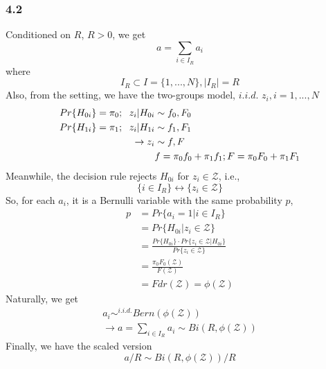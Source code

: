 \documentclass{article}
\begin{document}
\subsubsection*{4.2}
Conditioned on $R$, $R>0$, we get
\begin{displaymath}
a = \sum_{i\in I_R} a_i
\end{displaymath}
where 
\begin{displaymath}
I_R \subset I = \{1,...,N\}, |I_R| = R
\end{displaymath}
Also, from the setting, we have the two-groups model, $i.i.d.$ $z_i, i=1,...,N$
\begin{displaymath}
\begin{split}
Pr\{H_{0i}\}=\pi_0; \hspace{6 pt} z_i | H_{0i} &\sim f_0, F_0 \\
Pr\{H_{1i}\}=\pi_1; \hspace{6 pt} z_i | H_{1i} &\sim f_1, F_1 \\
\rightarrow z_i &\sim f,F \\
&f=\pi_0f_0+\pi_1f_1; F=\pi_0F_0 + \pi_1F_1
\end{split}
\end{displaymath}
Meanwhile, the decision rule rejects $H_{0i}$ for $z_i \in \mathcal{Z}$, i.e.,
\begin{displaymath}
\{i \in I_R\} \leftrightarrow \{z_i \in \mathcal{Z} \}
\end{displaymath}
So, for each $a_i$, it is a Bernulli variable with the same probability $p$,
\begin{displaymath}
\begin{split}
p &= Pr\{ a_i=1 | i\in I_R \} \\
&= Pr\{ H_{0i} | z_i\in \mathcal{Z} \} \\
&= \frac{Pr\{ H_{0i} \} \cdot Pr\{ z_i\in \mathcal{Z} | H_{0i}\}}{Pr\{ z_i\in \mathcal{Z} \}} \\
&= \frac{\pi_0 F_0(\mathcal{Z})}{F(\mathcal{Z})} \\
&= Fdr(\mathcal{Z}) = \phi(\mathcal{Z})
\end{split}
\end{displaymath}
Naturally, we get
\begin{displaymath}
\begin{split}
a_i \sim^{i.i.d.} Bern(\phi(\mathcal{Z})) \\
\rightarrow a =\sum_{i\in I_R} a_i \sim Bi(R, \phi(\mathcal{Z})) 
\end{split}
\end{displaymath}
Finally, we have the scaled version
\begin{displaymath}
a/R \sim Bi(R, \phi(\mathcal{Z}))/R
\end{displaymath}
 
\end{document}
